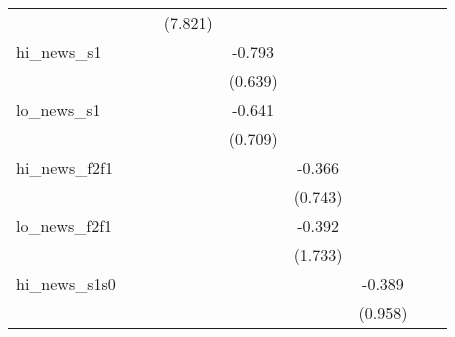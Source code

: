 {\begin{tabular}{l*{8}{c}}
            &                     &                     &     (7.821)         &                     &                     &                     &                     &                     \\
\addlinespace
hi\_news\_s1  &                     &                     &                     &      -0.793         &                     &                     &                     &                     \\
            &                     &                     &                     &     (0.639)         &                     &                     &                     &                     \\
\addlinespace
lo\_news\_s1  &                     &                     &                     &      -0.641         &                     &                     &                     &                     \\
            &                     &                     &                     &     (0.709)         &                     &                     &                     &                     \\
\addlinespace
hi\_news\_f2f1&                     &                     &                     &                     &      -0.366         &                     &                     &                     \\
            &                     &                     &                     &                     &     (0.743)         &                     &                     &                     \\
\addlinespace
lo\_news\_f2f1&                     &                     &                     &                     &      -0.392         &                     &                     &                     \\
            &                     &                     &                     &                     &     (1.733)         &                     &                     &                     \\
\addlinespace
hi\_news\_s1s0&                     &                     &                     &                     &                     &      -0.389         &                     &                     \\
            &                     &                     &                     &                     &                     &     (0.958)         &                     &                     \\

\end{tabular}}
